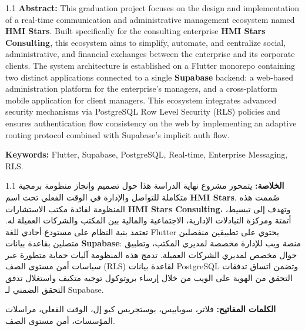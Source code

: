 \documentclass[12pt,a4paper,oneside]{report}
\begin{document}
\vspace{0.6cm}

\begin{spacing}{1.1}
\noindent \textbf{Abstract: } 
This graduation project focuses on the design and implementation of a real-time communication and administrative management ecosystem named \textbf{HMI Stars}. Built specifically for the consulting enterprise \textbf{HMI Stars Consulting}, this ecosystem aims to simplify, automate, and centralize social, administrative, and financial exchanges between the enterprise and its corporate clients. The system architecture is established on a Flutter monorepo containing two distinct applications connected to a single \textbf{Supabase} backend: a web-based administration platform for the enterprise's managers, and a cross-platform mobile application for client managers. This ecosystem integrates advanced security mechanisms via PostgreSQL Row Level Security (RLS) policies and ensures authentication flow consistency on the web by implementing an adaptive routing protocol combined with Supabase's implicit auth flow.

\noindent \textbf{Keywords: } Flutter, Supabase, PostgreSQL, Real-time, Enterprise Messaging, RLS.
\end{spacing}

\vspace{0.6cm}

\begin{otherlanguage}{arabic}
\begin{spacing}{1.1}
\noindent \textbf{الخلاصة: } 
يتمحور مشروع نهاية الدراسة هذا حول تصميم وإنجاز منظومة برمجية متكاملة للتواصل والإدارة في الوقت الفعلي تحت اسم \textbf{HMI Stars}. صُممت هذه المنظومة لفائدة مكتب الاستشارات \textbf{HMI Stars Consulting}، وتهدف إلى تبسيط، أتمتة ومركزة التبادلات الإدارية، الاجتماعية والمالية بين المكتب والشركات العميلة له. تعتمد بنية النظام على مستودع أحادي للغة Flutter يحتوي على تطبيقين منفصلين متصلين بقاعدة بيانات \textbf{Supabase}: منصة ويب للإدارة مخصصة لمديري المكتب، وتطبيق جوال مخصص لمديري الشركات العميلة. تدمج هذه المنظومة آليات حماية متطورة عبر سياسات أمن مستوى الصف (RLS) لقاعدة بيانات PostgreSQL وتضمن اتساق تدفقات التحقق من الهوية على الويب من خلال إرساء بروتوكول توجيه متكيف واستغلال تدفق التحقق الضمني لـ Supabase.

\noindent \textbf{الكلمات المفاتيح: } فلاتر، سوبابيس، بوستجريس كيو إل، الوقت الفعلي، مراسلات المؤسسات، أمن مستوى الصف.
\end{spacing}
\end{otherlanguage}
\vspace*{\fill}
\end{document}
